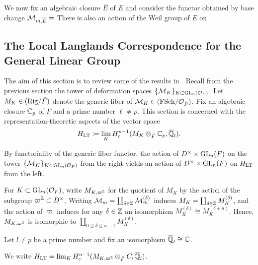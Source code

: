\documentclass[../main.tex]{subfiles}
\begin{document}
We now fix an algebraic closure $\bar E$ of $E$ and consider the functor
obtained by base change $\mathcal{M}_{m, \overline E} = $ 
There is also an action of the Weil group of $E$ on 


\subsection{The Local Langlands Correspondence for the General Linear Group} %
\label{sub:The Local Langlands Correspondence for the General Linear Group}
The aim of this section is to review some of the results in \cite{HTShimura}. 
Recall from the previous section the tower of deformation spaces 
$\{\mathcal{M}_K\}_{K \subset \operatorname{GL}_n(\mathcal{O}_F)}$. Let $M_K \in {(\mathrm{Rig}/{{\breve {F}}})}$ denote the
generic fiber of $\mathcal{M}_K \in {(\mathrm{FSch}/{\mathcal{O}_{{\breve {F}}}})}$. Fix an algebraic closure $\mathbb{C}_p$ of $F$ and a prime number $\ell
\neq p$. This section is concerned with the representation-theoretic aspects of
the vector space
\begin{equation*}
  H_{\mathrm{LT}} \coloneqq \lim_K H^{n-1}_c (M_{K} \otimes_{\breve F} \mathbb{C}_p, \overline {\mathbb{Q}}_l).
\end{equation*}

By functoriality of the generic fiber functor, the action of $D^\times \times
\operatorname{GL}_n(F)$ on the tower $\{\mathcal{M}_K\}_{K \subset \operatorname{GL}_n(\mathcal{O}_F)}$ from the right
yields an action of $D^\times \times \operatorname{GL}_n(F)$ on $H_{\mathrm{LT}}$ from the left. 

For $K \subset \operatorname{GL}_n(\mathcal{O}_F)$, write $M_{K, \varpi^{\mathbb{Z}}}$ for the quotient of 
$M_K$  by the action of the subgroup
$\varpi^{\mathbb{Z}} \subset D^\times$. Writing $\mathcal{M}_m = \coprod_{\delta \in \mathbb{Z}} \mathcal{M}_m^{(\delta)}$
induces $M_K = \coprod_{\delta \in\mathbb{Z}} M_K^{(\delta)}$, and 
the action of $\varpi$ induces for any $\delta \in \mathbb{Z}$ an isomorphism 
$M_K^{(\delta)} \cong M_K^{(\delta +n)}$. Hence, $M_{K, \varpi^{\mathbb{Z}}}$ is 
isomorphic to $\coprod_{0 \leq \delta \leq n-1} M_{K}^{(\delta)}$. 

Let $l \neq p$ be a prime number and fix an isomorphism $\overline {\mathbb{Q}}_l \cong \mathbb{C}$.

\begin{defi}
  We write $H_{\mathrm{LT}} = \lim_{K} H^{n-1}_c (M_{K, \varpi^{\mathbb{Z}}} \otimes_{\breve F} C, \overline {\mathbb{Q}}_l)$.
\end{defi}
\end{document}
